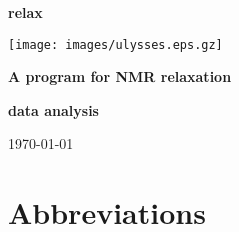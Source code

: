 \documentclass[a4paper, 11pt, twoside, openright]{book}
\begin{document}
\frontmatter



\begin{titlepage}
\begin{center}


{\Huge \textbf{relax}}

{\LARGE \textbf{}}

\centerline{\texttt{[image: images/ulysses.eps.gz]}}

{\huge \textbf{A program for NMR relaxation}}

{\huge \textbf{data analysis}}

{\large \today}

\end{center}
\end{titlepage}



\tableofcontents



\newpage
\listoffigures



\newpage
\listoftables



\chapter*{Abbreviations}
\end{document}
